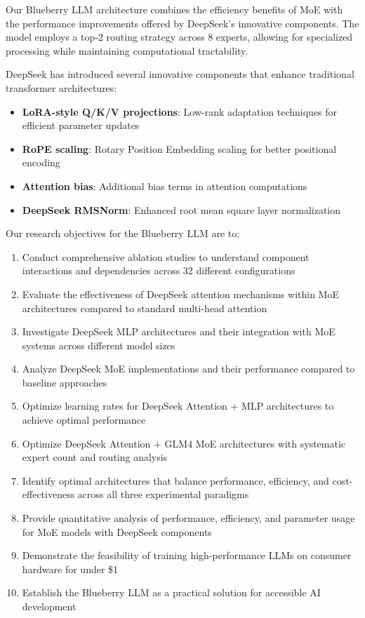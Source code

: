 \documentclass[11pt,a4paper]{article}
\begin{document}
Our Blueberry LLM architecture combines the efficiency benefits of MoE with the performance improvements offered by DeepSeek's innovative components. The model employs a top-2 routing strategy across 8 experts, allowing for specialized processing while maintaining computational tractability.

DeepSeek has introduced several innovative components that enhance traditional transformer architectures:
\begin{itemize}
    \item \textbf{LoRA-style Q/K/V projections}: Low-rank adaptation techniques for efficient parameter updates
    \item \textbf{RoPE scaling}: Rotary Position Embedding scaling for better positional encoding
    \item \textbf{Attention bias}: Additional bias terms in attention computations
    \item \textbf{DeepSeek RMSNorm}: Enhanced root mean square layer normalization
\end{itemize}

Our research objectives for the Blueberry LLM are to:
\begin{enumerate}
    \item Conduct comprehensive ablation studies to understand component interactions and dependencies across 32 different configurations
    \item Evaluate the effectiveness of DeepSeek attention mechanisms within MoE architectures compared to standard multi-head attention
    \item Investigate DeepSeek MLP architectures and their integration with MoE systems across different model sizes
    \item Analyze DeepSeek MoE implementations and their performance compared to baseline approaches
    \item Optimize learning rates for DeepSeek Attention + MLP architectures to achieve optimal performance
    \item Optimize DeepSeek Attention + GLM4 MoE architectures with systematic expert count and routing analysis
    \item Identify optimal architectures that balance performance, efficiency, and cost-effectiveness across all three experimental paradigms
    \item Provide quantitative analysis of performance, efficiency, and parameter usage for MoE models with DeepSeek components
    \item Demonstrate the feasibility of training high-performance LLMs on consumer hardware for under \$1
    \item Establish the Blueberry LLM as a practical solution for accessible AI development
\end{enumerate}
\end{document}
